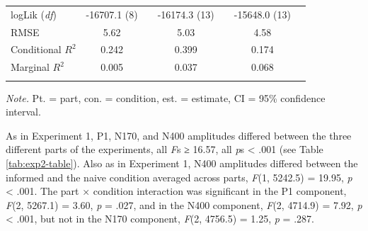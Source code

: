 \documentclass[
  english,
  doc,12pt,twoside,floatsintext]{apa7}
\begin{document}
\begin{table}[tbp]
\begin{center}
\begin{threeparttable}
{\begin{tabular}{lcccccc}
logLik (\textit{df}) & -16707.1 (8) &  & -16174.3 (13) &  & -15648.0 (13) & \\
RMSE & 5.62 &  & 5.03 &  & 4.58 & \\
Conditional $R^2$ & 0.242 &  & 0.399 &  & 0.174 & \\
Marginal $R^2$ & 0.005 &  & 0.037 &  & 0.068 & \\
\bottomrule
\addlinespace
\end{tabular}

}

\begin{tablenotes}[para]
\normalsize{\textit{Note.} Pt. = part, con. = condition, est. = estimate, CI = 95\% confidence interval.}
\end{tablenotes}

\end{threeparttable}
\end{center}

\end{table}

As in Experiment 1, P1, N170, and N400 amplitudes differed between the three different parts of the experiments, all \emph{F}s ≥ 16.57, all \emph{p}s \textless{} .001 (see Table \ref{tab:exp2-table}). Also as in Experiment 1, N400 amplitudes differed between the informed and the naive condition averaged across parts, \emph{F}(1, 5242.5) = 19.95, \emph{p} \textless{} .001. The part × condition interaction was significant in the P1 component, \emph{F}(2, 5267.1) = 3.60, \emph{p} = .027, and in the N400 component, \emph{F}(2, 4714.9) = 7.92, \emph{p} \textless{} .001, but not in the N170 component, \emph{F}(2, 4756.5) = 1.25, \emph{p} = .287.
\end{document}
